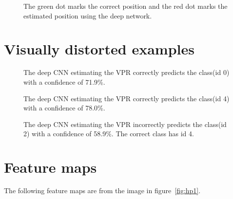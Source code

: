 \begin{figure}[H]
	\begin{center}
	\begin{scriptsize}
		\sffamily
		\def\svgwidth{0.9\textwidth}
		
	\end{scriptsize}
	\label{fig:aecollection}
	\caption[AR error examples visualised]{The green dot marks the correct position and the red dot marks the estimated position using the deep network.}
	\end{center}
\end{figure}

\section{Visually distorted examples}
\label{sec:vdexamples}
\begin{figure}[H]
	\begin{center}
	\begin{scriptsize}
		\sffamily
		
	\end{scriptsize}
	\label{fig:vd1}
	\caption[Visually distorted example]{The deep CNN estimating the VPR correctly predicts the class(id 0) with a confidence of 71.9\%.}
	\end{center}
\end{figure}

\begin{figure}[H]
	\begin{center}
	\begin{scriptsize}
		\sffamily
		
	\end{scriptsize}
	\label{fig:vd2}
	\caption[Visually distorted example]{The deep CNN estimating the VPR correctly predicts the class(id 4) with a confidence of 78.0\%.}
	\end{center}
\end{figure}

\begin{figure}[H]
	\begin{center}
	\begin{scriptsize}
		\sffamily
		
	\end{scriptsize}
	\label{fig:vd3}
	\caption[Visually distorted example]{The deep CNN estimating the VPR incorrectly predicts the class(id 2) with a confidence of 58.9\%. The correct class has id 4.}
	\end{center}
\end{figure}

\section{Feature maps}
\label{sec:featuremaps-appendix}
The following feature maps are from the image in figure~\ref{fig:hp1}.

